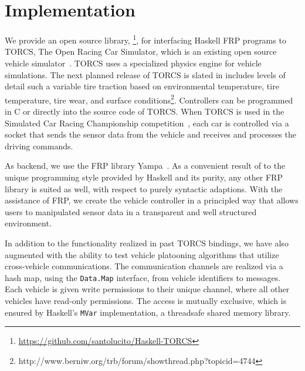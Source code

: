 \section{Implementation}

We provide an open source library, \ourLib\footnote{\url{https://github.com/santolucito/Haskell-TORCS}}, for interfacing Haskell FRP programs to TORCS, The Open Racing Car Simulator, which is an existing open source vehicle simulator~\cite{torcs}.
TORCS uses a specialized physics engine for vehicle simulations. 
The next planned release of TORCS is slated in includes levels of detail such a variable tire traction based on environmental temperature, tire temperature, tire wear, and surface conditions\footnote{http://www.berniw.org/trb/forum/showthread.php?topicid=4744}.
Controllers can be programmed in C or \CC directly into the source code of TORCS.
When TORCS is used in the Simulated Car Racing Championship competition~\cite{SCRC}, each car is controlled via a socket that sends the sensor data from the vehicle and receives and processes the driving commands.

As backend, we use the FRP library Yampa~\cite{courtney2003yampa}. 
As a convenient result of to the unique programming style provided by Haskell and its purity, any other FRP library is suited as well, with respect to purely syntactic adaptions.
With the assistance of FRP, we create the  vehicle controller in a principled way that allows users to manipulated sensor data in a transparent and well structured environment.



In addition to the functionality realized in past TORCS bindings, we have also augmented \ourLib with the ability to test vehicle platooning algorithms that utilize cross-vehicle communications.
The communication channels are realized via a hash map, using the \texttt{Data.Map} interface, from vehicle identifiers to messages.
Each vehicle is given write permissions to their unique channel, where all other vehicles have read-only permissions.
The access is mutually exclusive, which is ensured by Haskell's \texttt{MVar} implementation, a threadsafe shared memory library. %
